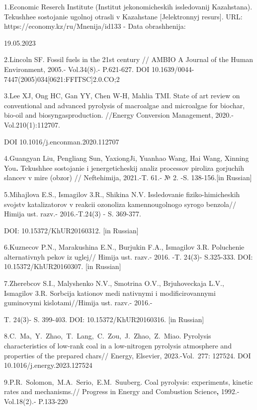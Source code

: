 \begin{noparindent}
1.Economic Reserch Institute (Institut jekonomicheskih issledovanij
Kazahstana). Tekushhee sostojanie ugol\textquotesingle noj otrasli v
Kazahstane {[}Jelektronnyj resurs{]}. URL:
https://economy.kz/ru/Mnenija/id133 - Data obrashhenija:

19.05.2023

2.Lincoln SF. Fossil fuels in the 21st century // AMBIO A Journal of the
Human Environment, 2005.- Vol.34(8).- P.621-627. DOI
10.1639/0044-7447(2005)034{[}0621:FFITSC{]}2.0.CO;2

3.Lee XJ, Ong HC, Gan YY, Chen W-H, Mahlia TMI. State of art review on
conventional and advanced pyrolysis of macroalgae and microalgae for
biochar, bio-oil and biosyngasproduction. //Energy Conversion
Management, 2020.-Vol.210(1):112707.

DOI 10.1016/j.enconman.2020.112707

4.Guangyan Liu, Pengliang Sun, YaxiongJi, Yuanhao Wang, Hai Wang,
Xinning You{\bfseries .} Tekushhee sostojanie i jenergeticheskij analiz
processov piroliza gorjuchih slancev v mire (obzor) // Neftehimija,
2021.-T. 61.- № 2. -S. 138-156.{[}in Russian{]}

5.Mihajlova E.S., Ismagilov 3.R., Shikina N.V. Issledovanie
fiziko-himicheskih svojstv katalizatorov v reakcii ozonoliza
kamennougol\textquotesingle nogo syrogo benzola// Himija ust. razv.-
2016.-T.24(3) - S. 369-377.

DOI: 10.15372/KhUR20160312. {[}in Russian{]}

6.Kuznecov P.N., Marakushina E.N., Burjukin F.A., Ismagilov 3.R.
Poluchenie al\textquotesingle ternativnyh pekov iz uglej// Himija ust.
razv.- 2016. -T. 24(3)- S.325-333. DOI: 10.15372/KhUR20160307. {[}in
Russian{]}

7.Zherebcov S.I., Malyshenko N.V., Smotrina O.V., Brjuhoveckaja L.V.,
Ismagilov 3.R. Sorbcija kationov medi nativnymi i modificirovannymi
guminovymi kislotami//Himija ust. razv.- 2016.-

T. 24(3)- S. 399-403. DOI: 10.15372/KhUR20160316. {[}in Russian{]}

8.C.~Ma,~Y.~Zhao,~T.~Lang,~C.~Zou,~J.~Zhao,~Z.~Miao. Pyrolysis
characteristics of low-rank coal in a low-nitrogen pyrolysis atmosphere
and properties of the prepared chars// Energy, Elsevier, 2023.-Vol.~277:
127524. DOI 10.1016/j.energy.2023.127524

9.P.R.~Solomon,~M.A.~Serio,~E.M.~Suuberg. Coal pyrolysis: experiments,
kinetic rates and mechanisms.// Progress in Energy and Combustion
Science{\bfseries ,} 1992.-Vol.18(2).- P.133-220


\end{noparindent}
